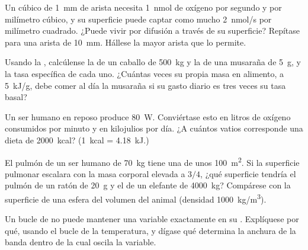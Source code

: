 \begin{exercise}[$\star\star$]\label{exo:b1:organism-environment:5}
Un  cúbico de \qty{1}{mm} de arista necesita \qty{1}{nmol} de
oxígeno por segundo y por milímetro cúbico, y su superficie puede captar
como mucho \qty{2}{nmol/s} por milímetro cuadrado. ¿Puede vivir por difusión
a través de su superficie? Repítase para una arista de \qty{10}{mm}.
Hállese la mayor arista que lo permite.
\end{exercise}

\begin{exercise}[$\star\star$]\label{exo:b1:organism-environment:6}
Usando la , calcúlense la  de un caballo
de \qty{500}{kg} y la de una musaraña de \qty{5}{g}, y la tasa específica de
cada uno. ¿Cuántas veces su propia masa en alimento, a \qty{5}{kJ/g}, debe
comer al día la musaraña si su gasto diario es tres veces su tasa basal?
\end{exercise}

\begin{exercise}[$\star\star$]\label{exo:b1:organism-environment:7}
Un ser humano en reposo produce \qty{80}{W}. Conviértase esto en litros de
oxígeno consumidos por minuto y en kilojulios por día. ¿A cuántos vatios
corresponde una dieta de \qty{2000}{kcal}? (\qty{1}{kcal} = \qty{4.18}{kJ}.)
\end{exercise}

\begin{exercise}[$\star\star$]\label{exo:b1:organism-environment:8}
El pulmón de un ser humano de \qty{70}{kg} tiene una  de unos \qty{100}{m^2}. Si la superficie pulmonar escalara con
la masa corporal elevada a $3/4$, ¿qué superficie tendría el pulmón de un
ratón de \qty{20}{g} y el de un elefante de \qty{4000}{kg}? Compárese con la
superficie de una esfera del volumen del animal (densidad
\qty{1000}{kg/m^3}).
\end{exercise}

\begin{exercise}[$\star\star$]\label{exo:b1:organism-environment:9}
Un bucle de  no puede mantener una variable
exactamente en su . Explíquese por qué, usando el bucle de
la temperatura, y dígase qué determina la anchura de la banda dentro de la
cual oscila la variable.
\end{exercise}

